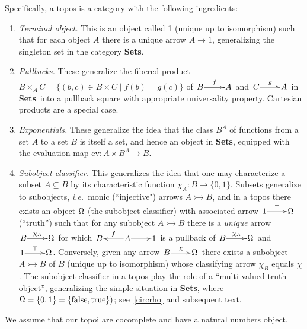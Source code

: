 \documentclass[12pt]{article}
\newcommand{\Sets}{\mbox{\textbf{Sets}}}
\newcommand{\raw}{\rightarrow} \newcommand{\rat}{\mapsto}
\newcommand{\x}{\times} \newcommand{\hb}{\hbar}
\newcommand{\er}{\eqref}
\newcommand{\ch}{\chi} \newcommand{\ps}{\psi} \newcommand{\Ps}{\Psi}
\newcommand{\ie}{\textit{i.e.}}
\begin{document}
Specifically,
a topos is a category with the following ingredients:
\begin{enumerate}
\item {\it Terminal object.} This is an object called 1 (unique up to
  isomorphism) such that for each object $A$ there is a unique arrow
  $A\raw 1$, generalizing the singleton set in the category \Sets.
\item {\it Pullbacks.} These generalize the fibered product $B\x_A
  C=\{(b,c)\in B\x C\mid f(b)=g(c)\}$  of $\xymatrix@1{B\ar^-{f}[r]&A}$ and
  $\xymatrix@1{C\ar^-{g}[r]&A}$ in \Sets\ into a pullback square with
  appropriate universality property.  Cartesian products are a special
  case.
\item {\it Exponentials.} These generalize the idea that the class
  $B^A$ of functions from a set $A$ to a set $B$ is itself a set, and
  hence an object in \Sets, equipped with the evaluation map
  $\mathrm{ev}:A\x B^A\raw B$.
\item {\it Subobject classifier.} This generalizes the idea that one
  may characterize a subset $A\subseteq B$ by its characteristic
  function $\ch_A:B\raw \{0,1\}$. Subsets generalize to subobjects,
  \ie\ monic (``injective") arrows $A \rightarrowtail B$, and in a
  topos there exists an object $\Omega$ (the subobject classifier) with
  associated arrow $\xymatrix@1{1\ar^-{\top}[r]&\Om}$ (``truth'') such
  that for any subobject $A \rightarrowtail B$ there is a {\it unique}
  arrow $\xymatrix@1{B\ar^-{\chi_A}[r]&\Om}$ for which
  $\xymatrix@1{B&A\ar_-{f}[l]\ar[r]&1}$ is a pullback of
  $\xymatrix@1{B\ar^-{\chi_A}[r]&\Om}$ and
  $\xymatrix@1{1\ar^-{\top}[r]&\Omega}$. Conversely, given any arrow
  $\xymatrix@1{B\ar^-{\ch}[r]&\Om}$ there exists a subobject $A
  \rightarrowtail B$
  of $B$ (unique up to isomorphism) whose classifying arrow $\ch_B$
  equals $\ch$. The subobject classifier in a topos play the role of a
  ``multi-valued truth object'', generalizing the simple situation in
  \Sets, where  $\Omega=\{0,1\}=\{\mathrm{false, true}\})$;
  see~\er{circrho} and subsequent text.
\end{enumerate}

We assume that our topoi are cocomplete and have a natural numbers object.
\end{document}
